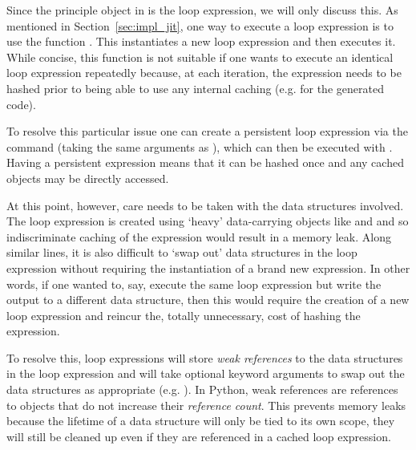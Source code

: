 Since the principle object in  is the loop expression, we will only discuss this.
As mentioned in Section~\ref{sec:impl_jit}, one way to execute a loop expression is to use the function .
This instantiates a new loop expression and then executes it.
While concise, this function is not suitable if one wants to execute an identical loop expression repeatedly because, at each iteration, the expression needs to be hashed prior to being able to use any internal caching (e.g. for the generated code).

To resolve this particular issue one can create a persistent loop expression via the command  (taking the same arguments as ), which can then be executed with .
Having a persistent expression means that it can be hashed once and any cached objects may be directly accessed.

At this point, however, care needs to be taken with the data structures involved.
The loop expression is created using `heavy' data-carrying objects like  and  and so indiscriminate caching of the expression would result in a memory leak.
Along similar lines, it is also difficult to `swap out' data structures in the loop expression without requiring the instantiation of a brand new expression.
In other words, if one wanted to, say, execute the same loop expression but write the output to a different data structure, then this would require the creation of a new loop expression and reincur the, totally unnecessary, cost of hashing the expression.

To resolve this,  loop expressions will store \textit{weak references} to the data structures in the loop expression and  will take optional keyword arguments to swap out the data structures as appropriate (e.g. ).
In Python, weak references are references to objects that do not increase their \textit{reference count}.
This prevents memory leaks because the lifetime of a data structure will only be tied to its own scope, they will still be cleaned up even if they are referenced in a cached loop expression.
